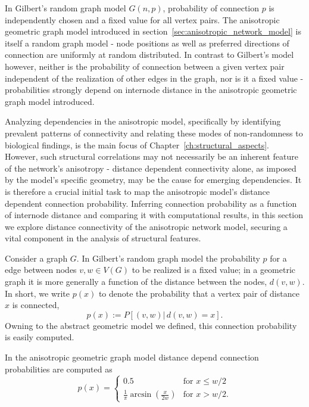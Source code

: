 In Gilbert's random graph model $G(n,p)$,
probability of connection $p$ is independently chosen and a fixed
value for all vertex pairs. The anisotropic geometric graph model
introduced in section~\ref{sec:anisotropic_network_model} is itself a
random graph model - node positions as well as preferred directions of
connection are uniformly at random distributed. In contrast to
Gilbert's model however, neither is the probability of connection
between a given vertex pair independent of the realization of other
edges in the graph, nor is it a fixed value - probabilities strongly
depend on internode distance in the anisotropic geometric graph model
introduced.

Analyzing dependencies in the anisotropic model, specifically by
identifying prevalent patterns of connectivity and relating these
modes of non-randomness to biological findings, is the main focus of
Chapter~\ref{ch:structural_aspects}. However, such structural
correlations may not necessarily be an inherent feature of the
network's anisotropy - distance dependent connectivity alone, as
imposed by the model's specific geometry, may be the cause for
emerging dependencies. It is therefore a crucial initial task to map
the anisotropic model's distance dependent connection
probability. Inferring connection probability as a function of
internode distance and comparing it with computational results, in
this section we explore distance connectivity of the anisotropic
network model, securing a vital component in the analysis of
structural features.

Consider a graph $G$. In Gilbert's random graph model the probability
$p$ for a edge between nodes $v,w \in V(G)$ to be realized is a fixed
value; in a geometric graph it is more generally a function of the
distance between the nodes, $d(v,w)$. In short, we write $p(x)$ to
denote the probability that a vertex pair of distance $x$ is
connected,
\[
  p(x) := P\left[(v,w)|\,d(v,w)=x\right].
\]
Owning to the abstract geometric model we defined, this connection
probability is easily computed.

\begin{proposition} \label{distance_prof}
In the anisotropic geometric graph model distance depend connection
probabilities are computed as 
\[
p(x) = \begin{cases} 0.5 & \mathrm{for} \,\, x\le w/2 \\
                       \frac{1}{\pi}
                       \operatorname{arcsin}(\frac{x}{2w}) &
                       \mathrm{for} \,\, x >
                       w/2. \end{cases}
\]
\end{proposition} 

